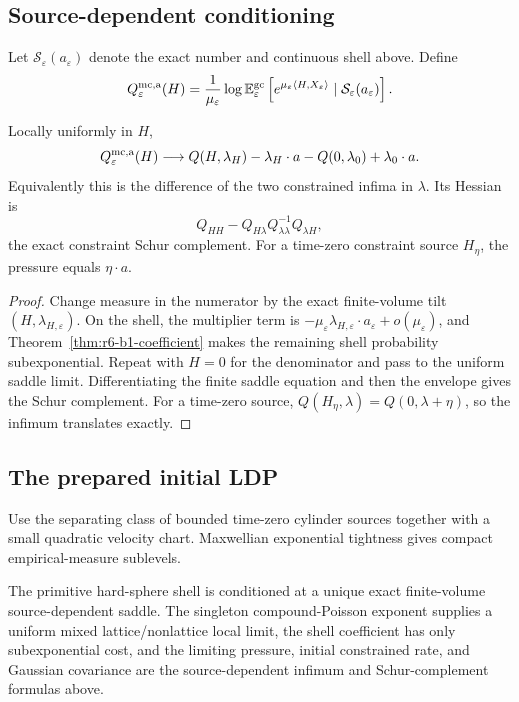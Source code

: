 \subsection{Source-dependent conditioning}

Let \(\mathcal S_\varepsilon(a_\varepsilon)\) denote the exact number and
continuous shell above.  Define
\[
Q_\varepsilon^{\rm mc,a}(H)=
\frac1{\mu_\varepsilon}\log
\mathbb E_\varepsilon^{\rm gc}
\left[e^{\mu_\varepsilon\langle H,X_\varepsilon\rangle}
\mid\mathcal S_\varepsilon(a_\varepsilon)\right].
\]

\begin{theorem}
\label{thm:r6-b1-transfer}
Locally uniformly in \(H\),
\[
Q_\varepsilon^{\rm mc,a}(H)\longrightarrow
Q(H,\lambda_H)-\lambda_H\cdot a
-Q(0,\lambda_0)+\lambda_0\cdot a.
\]
Equivalently this is the difference of the two constrained infima in
\(\lambda\).  Its Hessian is
\[
Q_{HH}-Q_{H\lambda}Q_{\lambda\lambda}^{-1}Q_{\lambda H},
\]
the exact constraint Schur complement.  For a time-zero constraint source
\(H_\eta\), the pressure equals \(\eta\cdot a\).
\end{theorem}

\begin{proof}
Change measure in the numerator by the exact finite-volume tilt
\((H,\lambda_{H,\varepsilon})\).  On the shell, the multiplier term is
\(-\mu_\varepsilon\lambda_{H,\varepsilon}\cdot a_\varepsilon+o(\mu_\varepsilon)\),
and Theorem~\ref{thm:r6-b1-coefficient} makes the remaining shell probability
subexponential.  Repeat with \(H=0\) for the denominator and pass to the
uniform saddle limit.  Differentiating the finite saddle equation and then the
envelope gives the Schur complement.  For a time-zero source,
\(Q(H_\eta,\lambda)=Q(0,\lambda+\eta)\), so the infimum translates exactly.
\end{proof}

\subsection{The prepared initial LDP}

Use the separating class of bounded time-zero cylinder sources together with a
small quadratic velocity chart.  Maxwellian exponential tightness gives
compact empirical-measure sublevels.

\begin{theorem}
\label{thm:r6-b1-main}
The primitive hard-sphere shell is conditioned at a unique exact finite-volume
source-dependent saddle.  The singleton compound-Poisson exponent supplies a
uniform mixed lattice/nonlattice local limit, the shell coefficient has only
subexponential cost, and the limiting pressure, initial constrained rate, and
Gaussian covariance are the source-dependent infimum and Schur-complement
formulas above.
\end{theorem}

